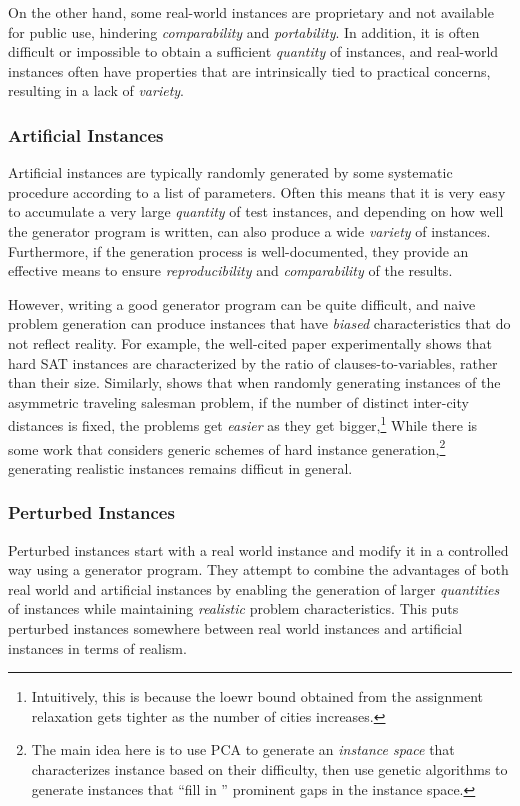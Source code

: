 \documentclass[12pt]{article}
\begin{document}
On the other hand, some real-world instances are proprietary and not available for public use, hindering \emph{comparability} and \emph{portability}. In addition, it is often difficult or impossible to obtain a sufficient \emph{quantity} of instances, and real-world instances often have properties that are intrinsically tied to practical concerns, resulting in a lack of \emph{variety}.

\subsubsection{Artificial Instances}
Artificial instances are typically randomly generated by some systematic procedure according to a list of parameters.  Often this means that it is very easy to accumulate a very large \emph{quantity} of test instances, and depending on how well the generator program is written, can also produce a wide \emph{variety} of instances. Furthermore, if the generation process is well-documented, they provide an effective means to ensure \emph{reproducibility} and \emph{comparability} of the results.

However, writing a good generator program can be quite difficult, and naive problem generation can produce instances that have \emph{biased} characteristics that do not reflect reality. For example, the well-cited paper \cite{mitchell1992hard} experimentally shows that hard SAT instances are characterized by the ratio of clauses-to-variables, rather than their size. Similarly, \cite{zhang2004phase} shows that when randomly generating instances of the asymmetric traveling salesman problem, if the number of distinct inter-city distances is fixed, the problems get \emph{easier} as they get bigger,\footnote{Intuitively, this is because the loewr bound obtained from the assignment relaxation gets tighter as the number of cities increases.}  While there is some work \cite{smith2015generating} that considers generic schemes of hard instance generation,\footnote{The main idea here is to use PCA to generate an \emph{instance space} that characterizes instance based on their difficulty, then use genetic algorithms to generate instances that ``fill in '' prominent gaps in the instance space.} generating realistic instances remains difficut in general.


\subsubsection{Perturbed Instances}
Perturbed instances start with a real world instance and modify it in a controlled way using a generator program. They attempt to combine the advantages of both real world and artificial instances by enabling the generation of larger \emph{quantities} of instances while maintaining \emph{realistic} problem characteristics. This puts perturbed instances somewhere between real world instances and artificial instances in terms of realism.
\end{document}
